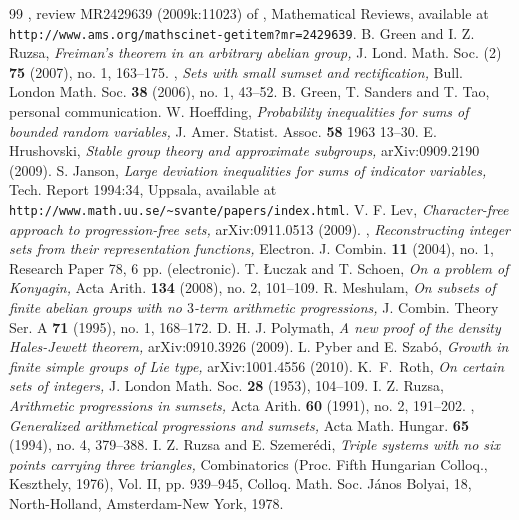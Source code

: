 \documentclass[12pt,a4paper,reqno]{amsart}
\numberwithin{equation}{section}
\theoremstyle{plain}
\theoremstyle{definition}
\begin{document}
\begin{thebibliography}{99}
 \bysame, review MR2429639 (2009k:11023) of \cite{luczak-schoen}, Mathematical Reviews, available at \verb+http://www.ams.org/mathscinet-getitem?mr=2429639+.
 B. Green and I. Z. Ruzsa, \emph{Freiman's theorem in an arbitrary abelian group,} J. Lond. Math. Soc. (2) \textbf{75} (2007), no. 1, 163--175.
 \bysame, \emph{Sets with small sumset and rectification,} Bull. London Math. Soc. \textbf{38} (2006), no. 1, 43--52.
 B. Green, T. Sanders and T. Tao, personal communication.
 W. Hoeffding, \emph{Probability inequalities for sums of bounded random variables,} J. Amer. Statist. Assoc. \textbf{58} 1963 13--30.
 E. Hrushovski, \emph{Stable group theory and approximate subgroups,} arXiv:0909.2190 (2009).
 S. Janson, \emph{Large deviation inequalities for sums of indicator variables,} Tech. Report 1994:34, Uppsala, available at \verb+http://www.math.uu.se/~svante/papers/index.html+.
 V. F. Lev, \emph{Character-free approach to progression-free sets,} arXiv:0911.0513 (2009).
 \bysame, \emph{Reconstructing integer sets from their representation functions,} Electron. J. Combin. \textbf{11} (2004), no. 1, Research Paper 78, 6 pp. (electronic).
 T. \L uczak and T. Schoen, \emph{On a problem of Konyagin,} Acta Arith. \textbf{134} (2008), no. 2, 101--109.
 R. Meshulam, \emph{On subsets of finite abelian groups with no $3$-term arithmetic progressions,} J. Combin. Theory Ser. A \textbf{71} (1995), no. 1, 168--172.
 D. H. J. Polymath, \emph{A new proof of the density Hales-Jewett theorem,} arXiv:0910.3926 (2009).
 L. Pyber and E. Szab\'o, \emph{Growth in finite simple groups of Lie type,} arXiv:1001.4556 (2010).
 K.~F.~Roth, \emph{On certain sets of integers,}  J. London Math. Soc.  \textbf{28} (1953), 104--109.
 I. Z. Ruzsa, \emph{Arithmetic progressions in sumsets,} Acta Arith. \textbf{60} (1991), no. 2, 191--202.
 \bysame, \emph{Generalized arithmetical progressions and sumsets,} Acta Math. Hungar. \textbf{65} (1994), no. 4, 379--388.
 I. Z. Ruzsa and E. Szemer\'edi, \emph{Triple systems with no six points carrying three triangles,} Combinatorics (Proc. Fifth Hungarian Colloq., Keszthely, 1976), Vol. II, pp. 939--945, Colloq. Math. Soc. J\'anos Bolyai, 18, North-Holland, Amsterdam-New York, 1978.

\end{thebibliography}
\end{document}
